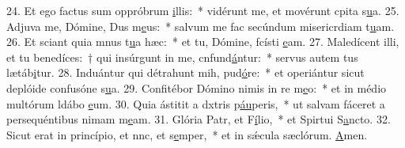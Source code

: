 24. Et ego factus sum oppróbrum \uline{i}llis:~* vidérunt me, et movérunt cpita s\uline{u}a.
25. Adjuva me, Dómine, Dus m\uline{e}us:~* salvum me fac secúndum misericrdiam t\uline{u}am.
26. Et sciant quia mnus t\uline{u}a hæc:~* et tu, Dómine, fcísti \uline{e}am.
27. Maledícent illi, et tu benedíces:~† qui insúrgunt in me, cnfund\uline{á}ntur:~* servus autem tus lætáb\uline{i}tur.
28. Induántur qui détrahunt mih, pud\uline{ó}re:~* et operiántur sicut deplóide confusóne s\uline{u}a.
29. Confitébor Dómino nimis in re m\uline{e}o:~* et in médio multórum ldábo \uline{e}um.
30. Quia ástitit a dxtris p\uline{áu}peris,~* ut salvam fáceret a persequéntibus nimam m\uline{e}am.
31. Glória Patr, et F\uline{í}lio,~* et Spirtui S\uline{a}ncto.
32. Sicut erat in princípio, et nnc, et s\uline{e}mper,~* et in sǽcula sæclórum. \uline{A}men.
